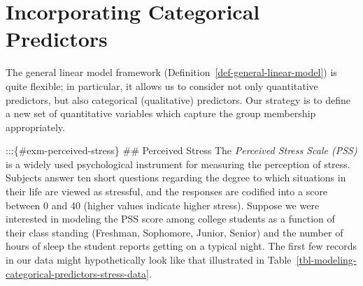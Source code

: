 \documentclass[
  letterpaper,
  DIV=11,
  numbers=noendperiod]{scrreprt}
\theoremstyle{definition}
\theoremstyle{definition}
\theoremstyle{remark}
\begin{document}
\hypertarget{sec-modeling-categorical-predictors}{%
\chapter{Incorporating Categorical
Predictors}\label{sec-modeling-categorical-predictors}}

\providecommand{\norm}[1]{\lVert#1\rVert}
\providecommand{\abs}[1]{\lvert#1\rvert}
\providecommand{\dist}[1]{\stackrel{\text{#1}}{\sim}}
\providecommand{\ind}[1]{\mathbb{I}\left(#1\right)}
\providecommand{\bm}[1]{\mathbf{#1}}
\providecommand{\bs}[1]{\boldsymbol{#1}}
\providecommand{\Ell}{\mathcal{L}}
\providecommand{\indep}{\perp\negthickspace\negmedspace\perp}

The general linear model framework
(Definition~\ref{def-general-linear-model}) is quite flexible; in
particular, it allows us to consider not only quantitative predictors,
but also categorical (qualitative) predictors. Our strategy is to define
a new set of quantitative variables which capture the group membership
appropriately.

:::\{\#exm-perceived-stress\} \#\# Perceived Stress The \emph{Perceived
Stress Scale (PSS)} is a widely used psychological instrument for
measuring the perception of stress. Subjects answer ten short questions
regarding the degree to which situations in their life are viewed as
stressful, and the responses are codified into a score between 0 and 40
(higher values indicate higher stress). Suppose we were interested in
modeling the PSS score among college students as a function of their
class standing (Freshman, Sophomore, Junior, Senior) and the number of
hours of sleep the student reports getting on a typical night. The first
few records in our data might hypothetically look like that illustrated
in Table~\ref{tbl-modeling-categorical-predictors-stress-data}.
\end{document}
